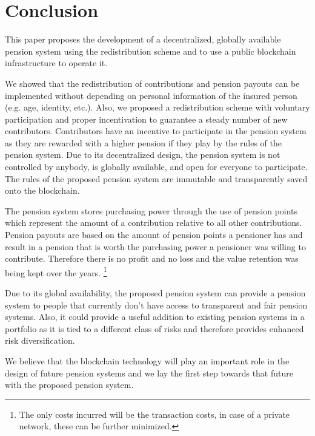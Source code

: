 \section{Conclusion}

This paper proposes the development of a decentralized, globally available pension system using the redistribution scheme and to use a public blockchain infrastructure to 
operate it.

We showed that the redistribution of contributions and pension payouts can be implemented without depending on personal information of the insured person (e.g. age, identity, etc.). 
Also, we proposed a redistribution scheme with voluntary participation and proper incentivation to guarantee a steady number of new contributors. Contributors have an incentive to participate in the pension system as they are rewarded with a higher pension if they play by the rules of the pension system. 
Due to its decentralized design, the pension system is not controlled by anybody, is globally available, and open for everyone to participate. The rules of the proposed pension system are immutable and transparently saved onto the blockchain. 

The pension system stores purchasing power through the use of pension points which represent the amount of a contribution relative to all other contributions. Pension payouts are based on the amount of pension points a pensioner has and result in a pension that is worth the purchasing power a pensioner was willing to contribute. Therefore there is no profit and no loss and the value retention was being kept over the  years. \footnote{ The only costs incurred will be the transaction costs, in case of a private network, these can be further minimized.}
 
Due to its global availability, the proposed pension system can provide a pension system to people that currently don't have access to transparent and fair pension systems. Also, it could provide a useful addition to existing pension systems in a portfolio as it is tied to a different class of risks and therefore provides enhanced risk diversification.

We believe that the blockchain technology will play an important role in the design of future pension systems and we lay the first step towards that future with the proposed pension system.